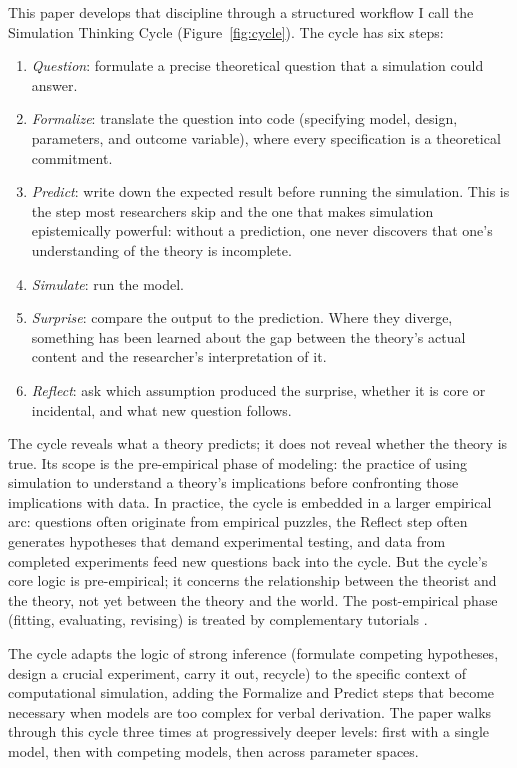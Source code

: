 \documentclass[fleqn,10pt]{wlscirep}
\begin{document}
\begin{linenumbers}
This paper develops that discipline through a structured workflow I call the Simulation Thinking Cycle (Figure~\ref{fig:cycle}). The cycle has six steps:
\begin{enumerate}
\item \emph{Question}: formulate a precise theoretical question that a simulation could answer.
\item \emph{Formalize}: translate the question into code (specifying model, design, parameters, and outcome variable), where every specification is a theoretical commitment.
\item \emph{Predict}: write down the expected result before running the simulation. This is the step most researchers skip and the one that makes simulation epistemically powerful: without a prediction, one never discovers that one's understanding of the theory is incomplete.
\item \emph{Simulate}: run the model.
\item \emph{Surprise}: compare the output to the prediction. Where they diverge, something has been learned about the gap between the theory's actual content and the researcher's interpretation of it.
\item \emph{Reflect}: ask which assumption produced the surprise, whether it is core or incidental, and what new question follows.
\end{enumerate}

The cycle reveals what a theory predicts; it does not reveal whether the theory is true. Its scope is the pre-empirical phase of modeling: the practice of using simulation to understand a theory's implications before confronting those implications with data. In practice, the cycle is embedded in a larger empirical arc: questions often originate from empirical puzzles, the Reflect step often generates hypotheses that demand experimental testing, and data from completed experiments feed new questions back into the cycle. But the cycle's core logic is pre-empirical; it concerns the relationship between the theorist and the theory, not yet between the theory and the world. The post-empirical phase (fitting, evaluating, revising) is treated by complementary tutorials \citep{wilson2019ten, farrell2018computational, lee2013bayesian}.

The cycle adapts the logic of strong inference \citep{platt1964strong} (formulate competing hypotheses, design a crucial experiment, carry it out, recycle) to the specific context of computational simulation, adding the Formalize and Predict steps that become necessary when models are too complex for verbal derivation. The paper walks through this cycle three times at progressively deeper levels: first with a single model, then with competing models, then across parameter spaces.

\end{linenumbers}
\end{document}
